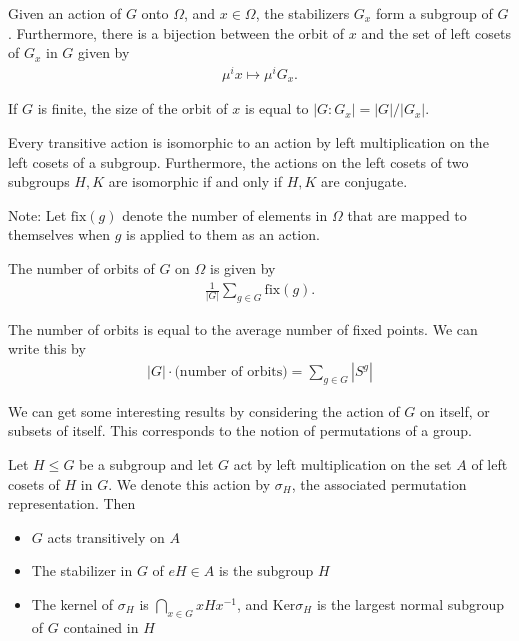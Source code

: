 \documentclass{memoir}
\begin{document}
\begin{thm}
	Given an action of \(G\) onto \(\Omega\), and \(x \in \Omega\), the stabilizers \(G_x\) form a subgroup of \(G\). Furthermore, there is a bijection between the orbit of \(x\) and the set of left cosets of \(G_x\) in \(G\) given by
	\begin{align*}
		\mu^{i}x \mapsto \mu^{i}G_x.
	\end{align*}
\end{thm}
If \(G\) is finite, the size of the orbit of \(x\) is equal to \( \left| G:G_x \right| = \left| G \right| / \left| G_x \right| \).

\begin{cor}
	Every transitive action is isomorphic to an action by left multiplication on the left cosets of a subgroup. Furthermore, the actions on the left cosets of two subgroups \(H,K\) are isomorphic if and only if \(H,K\) are conjugate.
\end{cor}

Note: Let \( \textrm{fix}(g)\) denote the number of elements in \(\Omega\) that are mapped to themselves when \(g\) is applied to them as an action.

\begin{thm}
	The number of orbits of \(G\) on \(\Omega\) is given by
	\begin{align*}
	\frac{1}{\left| G \right| } \sum_{g\in G} \textrm{fix}(g).	
\end{align*}
\end{thm}

\begin{lemma}
	The number of orbits is equal to the average number of fixed points. We can write this by
	\begin{align*}
		\left| G \right| \cdot \text{(number of orbits)} = \sum_{g\in G} \left| S^{g} \right| 
	\end{align*}
\end{lemma}

We can get some interesting results by considering the action of \(G\) on itself, or subsets of itself. This corresponds to the notion of permutations of a group.

\begin{thm}
	Let \(H\leq G\) be a subgroup and let \(G\) act by left multiplication on the set \(A\) of left cosets of \(H\) in \(G\). We denote this action by \(\sigma_H\), the associated permutation representation. Then
	\begin{itemize}
		\item \(G\) acts transitively on \(A\) 
		\item The stabilizer in \(G\) of \(eH \in A\) is the subgroup \(H\) 
		\item The kernel of \(\sigma_H\) is \(\bigcap_{x \in G} xHx ^{-1}\), and \(\textrm{Ker}\sigma_H\) is the largest normal subgroup of \(G\) contained in \(H\)
	\end{itemize}
\end{thm}
\end{document}
